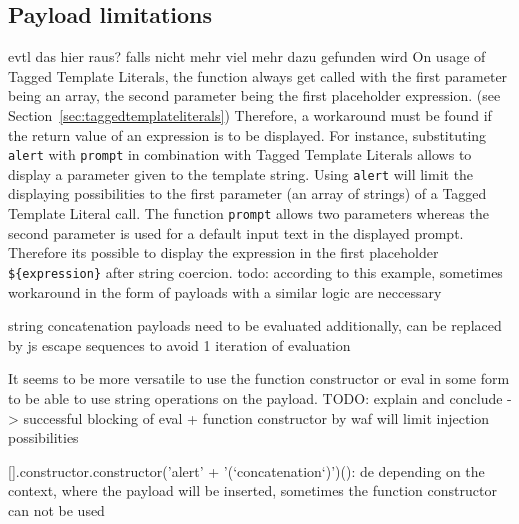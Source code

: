 \subsection{Payload limitations}
\label{sec:payloadlimitations}
{\color{blue} evtl das hier raus? falls nicht mehr viel mehr dazu gefunden wird}
On usage of Tagged Template Literals, the function always get called with the first parameter being an array, the second parameter being the first placeholder expression. (see Section~\ref{sec:taggedtemplateliterals}) Therefore, a workaround must be found if the return value of an expression is to be displayed. For instance, substituting \verb|alert| with \verb|prompt| in combination with Tagged Template Literals allows to display a parameter given to the template string. Using \verb|alert| will limit the displaying possibilities to the first parameter (an array of strings) of a Tagged Template Literal call. The function \verb|prompt| allows two parameters whereas the second parameter is used for a default input text in the displayed prompt. \cite{js/prompt} Therefore its possible to display the expression in the first placeholder \verb|${expression}| after string coercion. {\color{red} todo: according to this example, sometimes workaround in the form of payloads with a similar logic are neccessary}

string concatenation payloads need to be evaluated additionally, can be replaced by js escape sequences to avoid 1 iteration of evaluation

It seems to be more versatile to use the function constructor or eval in some form to be able to use string operations on the payload. {\color{red} TODO: explain and conclude -> successful blocking of eval + function constructor by waf will limit injection possibilities}

{}[].constructor.constructor('alert' + '(`concatenation`)')(): de
depending on the context, where the payload will be inserted, sometimes the function constructor can not be used 

